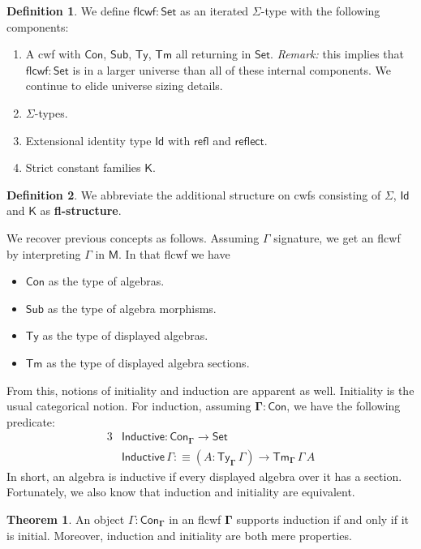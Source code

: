 \documentclass[12pt,a4paper,twoside,openany]{book}
\theoremstyle{remark}
\theoremstyle{definition}
\newtheorem{mydefinition}{Definition}
\theoremstyle{theorem}
\newtheorem{theorem}{Theorem}
\newcommand{\ms}[1]{\mathsf{#1}}
\newcommand{\refl}{\mathsf{refl}}
\newcommand{\reflect}{\mathsf{reflect}}
\newcommand{\Con}{\mathsf{Con}}
\newcommand{\Sub}{\mathsf{Sub}}
\newcommand{\Tm}{\mathsf{Tm}}
\newcommand{\Ty}{\mathsf{Ty}}
\newcommand{\Id}{\mathsf{Id}}
\newcommand{\ra}{\rightarrow}
\newcommand{\Set}{\mathsf{Set}}
\newcommand{\flcwf}{\mathsf{flcwf}}
\newcommand{\K}{\mathsf{K}}
\newcommand{\bCon}{\boldsymbol{\Con}}
\newcommand{\bGamma}{\boldsymbol{\Gamma}}
\newcommand{\bM}{\boldsymbol{\mathsf{M}}}
\newcommand{\Inductive}{\ms{Inductive}}
\newcommand{\defn}{:\equiv}
\begin{document}
\begin{mydefinition}\label{def:flcwf}
We define $\flcwf : \Set$ as an iterated $\Sigma$-type with the following components:
\begin{enumerate}
  \item A cwf with $\Con$, $\Sub$, $\Ty$, $\Tm$ all returning in $\Set$. \emph{Remark:}
        this implies that $\flcwf : \Set$ is in a larger universe than all of these
        internal components. We continue to elide universe sizing details.
  \item $\Sigma$-types.
  \item Extensional identity type $\Id$ with $\refl$ and $\reflect$.
  \item Strict constant families $\K$.
\end{enumerate}
\end{mydefinition}
\begin{mydefinition}
We abbreviate the additional structure on cwfs consisting of $\Sigma$, $\Id$ and
$\K$ as \textbf{fl-structure}.
\end{mydefinition}

We recover previous concepts as follows. Assuming $\Gamma$ signature, we get an
flcwf by interpreting $\Gamma$ in $\bM$. In that flcwf we have
\begin{itemize}
  \item $\Con$ as the type of algebras.
  \item $\Sub$ as the type of algebra morphisms.
  \item $\Ty$ as the type of displayed algebras.
  \item $\Tm$ as the type of displayed algebra sections.
\end{itemize}
From this, notions of initiality and induction are apparent as well. Initiality
is the usual categorical notion. For induction, assuming $\bGamma : \bCon$, we
have the following predicate:
\begin{alignat*}{3}
  & \Inductive : \Con_{\bGamma} \to \Set\\
  & \Inductive\,\Gamma \defn (A : \Ty_{\bGamma}\,\Gamma)\ra \Tm_{\bGamma}\,\Gamma\,A
\end{alignat*}
In short, an algebra is inductive if every displayed algebra over it has a
section. Fortunately, we also know that induction and initiality are
equivalent.

\begin{theorem}\label{thm:initiality-induction}
An object $\Gamma : \Con_{\bGamma}$ in an flcwf $\bGamma$ supports induction if
and only if it is initial. Moreover, induction and initiality are both mere
properties.
\end{theorem}
\end{document}
